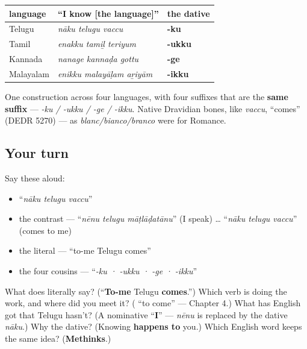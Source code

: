 \begin{cousinweb}
\noindent
\begin{tabularx}{\linewidth}{@{}>{\raggedright\arraybackslash}X>{\raggedright\arraybackslash}X>{\raggedright\arraybackslash}X@{}}
\toprule
\textbf{language} & \textbf{\textquotedblleft{}I know {[}the language{]}\textquotedblright{}} & \textbf{the dative} \\
\midrule
Telugu & \emph{nāku telugu vaccu} & \textbf{-ku} \\
Tamil & \emph{enakku tamiḻ teriyum} & \textbf{-ukku} \\
Kannada & \emph{nanage kannaḍa gottu} & \textbf{-ge} \\
Malayalam & \emph{enikku malayāḷam aṟiyām} & \textbf{-ikku} \\
\bottomrule
\end{tabularx}

One construction across four languages, with four suffixes that are the \textbf{same suffix} — \emph{-ku / -ukku / -ge / -ikku}. Native Dravidian bones, like \emph{vaccu}, \textquotedblleft{}comes\textquotedblright{} (DEDR 5270) — as \emph{blanc/bianco/branco} were for Romance.
\end{cousinweb}

\subsection*{Your turn}
Say these aloud:

\begin{itemize}
\raggedright
  \item \textquotedblleft{}\emph{nāku telugu vaccu}\textquotedblright{}
  \item the contrast — \textquotedblleft{}\emph{nēnu telugu māṭlāḍatānu}\textquotedblright{} (I speak) … \textquotedblleft{}\emph{nāku telugu vaccu}\textquotedblright{} (comes to me)
  \item the literal — \textquotedblleft{}to-me Telugu comes\textquotedblright{}
  \item the four cousins — \textquotedblleft{}\emph{-ku · -ukku · -ge · -ikku}\textquotedblright{}
\end{itemize}

\begin{tcolorbox}[breakable,colback=teal!4,colframe=teal!35!black,title={Before you move on}]
What does \textbf{  } literally say? (\textquotedblleft{}\textbf{To-me} Telugu \textbf{comes}.\textquotedblright{}) Which verb is doing the work, and where did you meet it? (\textbf{} \textquotedblleft{}to come\textquotedblright{} — Chapter 4.) What has English got that Telugu hasn't? (A nominative \textquotedblleft{}\textbf{I}\textquotedblright{} — \emph{nēnu} is replaced by the dative \emph{nāku}.) Why the dative? (Knowing \textbf{happens to} you.) Which English word keeps the same idea? (\textbf{Methinks}.)
\end{tcolorbox}
